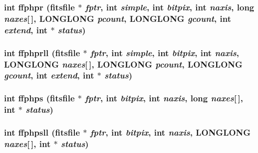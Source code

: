 \subsubsection{\setlength{\rightskip}{0pt plus 5cm}int ffphpr (\bf{fitsfile} $\ast$ {\em fptr}, int {\em simple}, int {\em bitpix}, int {\em naxis}, long {\em naxes}[$\,$], \bf{LONGLONG} {\em pcount}, \bf{LONGLONG} {\em gcount}, int {\em extend}, int $\ast$ {\em status})}\label{test_2roimasker_2fitsio_8h_9ecd5651c69ef6598a8595041c8cc95d}


\subsubsection{\setlength{\rightskip}{0pt plus 5cm}int ffphprll (\bf{fitsfile} $\ast$ {\em fptr}, int {\em simple}, int {\em bitpix}, int {\em naxis}, \bf{LONGLONG} {\em naxes}[$\,$], \bf{LONGLONG} {\em pcount}, \bf{LONGLONG} {\em gcount}, int {\em extend}, int $\ast$ {\em status})}\label{test_2roimasker_2fitsio_8h_8e5d505b66eaf3eb8a80be304d7c90eb}


\subsubsection{\setlength{\rightskip}{0pt plus 5cm}int ffphps (\bf{fitsfile} $\ast$ {\em fptr}, int {\em bitpix}, int {\em naxis}, long {\em naxes}[$\,$], int $\ast$ {\em status})}\label{test_2roimasker_2fitsio_8h_bf45c383dfb1d96dce837170d0b83600}


\subsubsection{\setlength{\rightskip}{0pt plus 5cm}int ffphpsll (\bf{fitsfile} $\ast$ {\em fptr}, int {\em bitpix}, int {\em naxis}, \bf{LONGLONG} {\em naxes}[$\,$], int $\ast$ {\em status})}\label{test_2roimasker_2fitsio_8h_aaefbdbf8f11e0fa90741e5163f6f82a}


